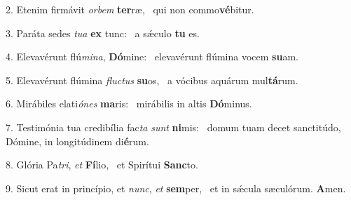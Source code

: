 2. Etenim firmávit \textit{or}\textit{bem} \textbf{ter}ræ, \ast\  qui non commo\textbf{vé}bitur.\

3. Paráta sedes \textit{tu}\textit{a} \textbf{ex} tunc: \ast\  a sǽculo \textbf{tu} es.\

4. Elevavérunt flú\textit{mi}\textit{na}, \textbf{Dó}mine: \ast\  elevavérunt flúmina vocem \textbf{su}am.\

5. Elevavérunt flúmina \textit{fluc}\textit{tus} \textbf{su}os, \ast\  a vócibus aquárum mul\textbf{tá}rum.\

6. Mirábiles elati\textit{ó}\textit{nes} \textbf{ma}ris: \ast\  mirábilis in altis \textbf{Dó}minus.\

7. Testimónia tua credibília fac\textit{ta} \textit{sunt} \textbf{ni}mis: \ast\  domum tuam decet sanctitúdo, Dómine, in longitúdinem di\textbf{é}rum.\

8. Glória Pa\textit{tri}, \textit{et} \textbf{Fí}lio, \ast\  et Spirítui \textbf{Sanc}to.\

9. Sicut erat in princípio, et \textit{nunc}, \textit{et} \textbf{sem}per, \ast\  et in sǽcula sæculórum. \textbf{A}men.\

